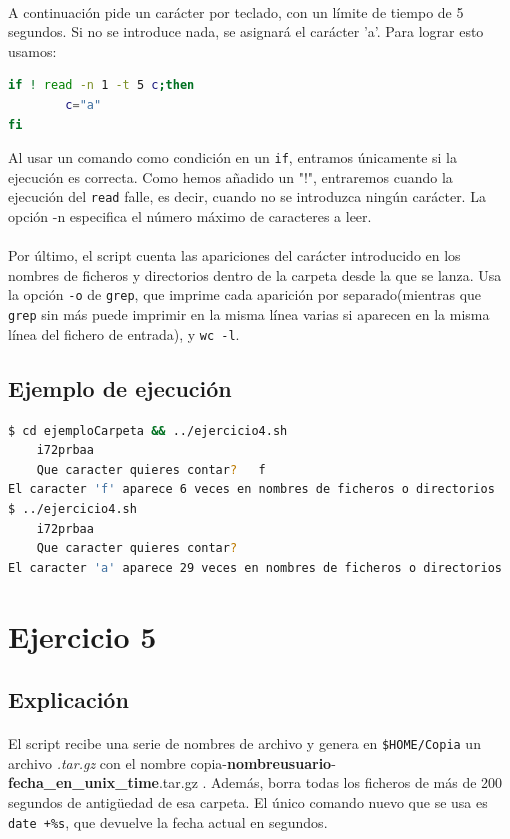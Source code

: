 \documentclass[12pt,a4paper]{article}
\begin{document}
\paragraph{}
A continuación pide un carácter por teclado, con un límite de tiempo de 5 segundos. Si no se introduce nada, se asignará el carácter 'a'. Para lograr esto usamos:
\begin{lstlisting}[basicstyle=\ttfamily\small,language=bash]
if ! read -n 1 -t 5 c;then   
        c="a"
fi  
\end{lstlisting}
Al usar un comando como condición en un \texttt{if}, entramos únicamente si la ejecución es correcta. Como hemos añadido un "!", entraremos cuando la ejecución del \texttt{read} falle, es decir, cuando no se introduzca ningún carácter. La opción -n especifica el número máximo de caracteres a leer.

\paragraph{}
Por último, el script cuenta las apariciones del carácter introducido en los nombres de ficheros y directorios dentro de la carpeta desde la que se lanza. Usa la opción \texttt{-o} de \texttt{grep}, que imprime cada aparición por separado(mientras que \texttt{grep} sin más puede imprimir en la misma línea varias si aparecen en la misma línea del fichero de entrada), y \texttt{wc -l}.

\subsection{Ejemplo de ejecución}
\begin{lstlisting}[basicstyle=\ttfamily\scriptsize,language=bash]
$ cd ejemploCarpeta && ../ejercicio4.sh
	i72prbaa
	Que caracter quieres contar?   f
El caracter 'f' aparece 6 veces en nombres de ficheros o directorios
$ ../ejercicio4.sh
	i72prbaa
	Que caracter quieres contar?
El caracter 'a' aparece 29 veces en nombres de ficheros o directorios
\end{lstlisting}
\pagebreak

\section{Ejercicio 5}
\subsection{Explicación}
\paragraph{}
El script recibe una serie de nombres de archivo y genera en \texttt{\$HOME/Copia} un archivo \textit{.tar.gz} con el nombre copia-\textbf{nombreusuario}-\textbf{fecha\_en\_unix\_time}.tar.gz . Además, borra todas los ficheros de más de 200 segundos de antigüedad de esa carpeta. El único comando nuevo que se usa es \texttt{date +\%s}, que devuelve la fecha actual en segundos.
\end{document}
